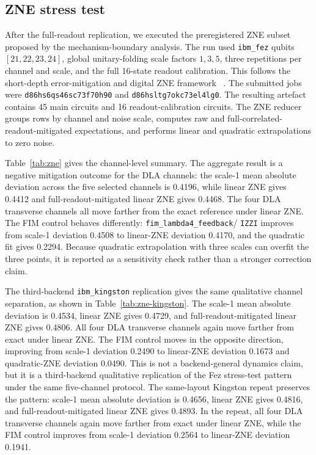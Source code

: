 \documentclass[preprint,aps,physrev,superscriptaddress,floatfix,longbibliography]{revtex4-2}
\begin{document}
\subsection{ZNE stress test}

After the full-readout replication, we executed the preregistered ZNE subset
proposed by the mechanism-boundary analysis. The run used \texttt{ibm\_fez}
qubits $[21,22,23,24]$, global unitary-folding scale factors $1,3,5$, three
repetitions per channel and scale, and the full 16-state readout calibration.
This follows the short-depth error-mitigation and digital ZNE framework
~\cite{Temme2017,LiBenjamin2017,Endo2021,GiurgicaTiron2020}.
The submitted jobs were \texttt{d86hs6qs46sc73f70h90} and
\texttt{d86hsltg7okc73el4lg0}. The resulting artefact contains 45 main
circuits and 16 readout-calibration circuits. The ZNE reducer groups rows by
channel and noise scale, computes raw and full-correlated-readout-mitigated
expectations, and performs linear and quadratic extrapolations to zero noise.

Table~\ref{tab:zne} gives the channel-level summary. The aggregate result is a
negative mitigation outcome for the DLA channels: the scale-1 mean absolute
deviation across the five selected channels is 0.4196, while linear ZNE gives
0.4412 and full-readout-mitigated linear ZNE gives 0.4468. The four DLA
transverse channels all move farther from the exact reference under linear
ZNE. The FIM control behaves differently: \texttt{fim\_lambda4\_feedback}/
\texttt{IZZI} improves from scale-1 deviation 0.4508 to linear-ZNE deviation
0.4170, and the quadratic fit gives 0.2294. Because quadratic extrapolation
with three scales can overfit the three points, it is reported as a sensitivity
check rather than a stronger correction claim.

The third-backend \texttt{ibm\_kingston} replication gives the same qualitative
channel separation, as shown in Table~\ref{tab:zne-kingston}. The scale-1 mean
absolute deviation is 0.4534, linear ZNE gives 0.4729, and
full-readout-mitigated linear ZNE gives 0.4806. All four DLA transverse
channels again move farther from exact under linear ZNE. The FIM control moves
in the opposite direction, improving from scale-1 deviation 0.2490 to
linear-ZNE deviation 0.1673 and quadratic-ZNE deviation 0.0490. This is not a
backend-general dynamics claim, but it is a third-backend qualitative
replication of the Fez stress-test pattern under the same five-channel
protocol. The same-layout Kingston repeat preserves the pattern: scale-1 mean
absolute deviation is 0.4656, linear ZNE gives 0.4816, and
full-readout-mitigated linear ZNE gives 0.4893. In the repeat, all four DLA
transverse channels again move farther from exact under linear ZNE, while the
FIM control improves from scale-1 deviation 0.2564 to linear-ZNE deviation
0.1941.
\end{document}
